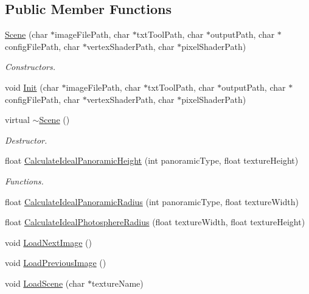 \subsection*{Public Member Functions}
\begin{DoxyCompactItemize}
\item 
\hyperlink{class_scene_afba62439dfcdf3b5bcbce46635ea0dd8}{Scene} (char $\ast$image\+File\+Path, char $\ast$txt\+Tool\+Path, char $\ast$output\+Path, char $\ast$config\+File\+Path, char $\ast$vertex\+Shader\+Path, char $\ast$pixel\+Shader\+Path)
\begin{DoxyCompactList}\small\item\em Constructors. \end{DoxyCompactList}\item 
void \hyperlink{class_scene_a1f36ab9f3f9c1286e79e63c37ca0580f}{Init} (char $\ast$image\+File\+Path, char $\ast$txt\+Tool\+Path, char $\ast$output\+Path, char $\ast$config\+File\+Path, char $\ast$vertex\+Shader\+Path, char $\ast$pixel\+Shader\+Path)
\item 
virtual \hyperlink{class_scene_a3b8cec2e32546713915f8c6303c951f1}{$\sim$\+Scene} ()
\begin{DoxyCompactList}\small\item\em Destructor. \end{DoxyCompactList}\item 
float \hyperlink{class_scene_abf429ee85b796b169893ffaf06175135}{Calculate\+Ideal\+Panoramic\+Height} (int panoramic\+Type, float texture\+Height)
\begin{DoxyCompactList}\small\item\em Functions. \end{DoxyCompactList}\item 
float \hyperlink{class_scene_af396d1333d3b5962f9f8e35bf9d32a6e}{Calculate\+Ideal\+Panoramic\+Radius} (int panoramic\+Type, float texture\+Width)
\item 
float \hyperlink{class_scene_a809f95f87e8f216c33e27fcd267c97f0}{Calculate\+Ideal\+Photosphere\+Radius} (float texture\+Width, float texture\+Height)
\item 
void \hyperlink{class_scene_a4ebb93f83b5bb2fc07212f50073553e0}{Load\+Next\+Image} ()
\item 
void \hyperlink{class_scene_a6797c971d3538791e54e7ab4ff3fb62a}{Load\+Previous\+Image} ()
\item 
void \hyperlink{class_scene_ac838f4934de41a367c54c15a30e2b08d}{Load\+Scene} (char $\ast$texture\+Name)
\item 

\end{DoxyCompactItemize}
